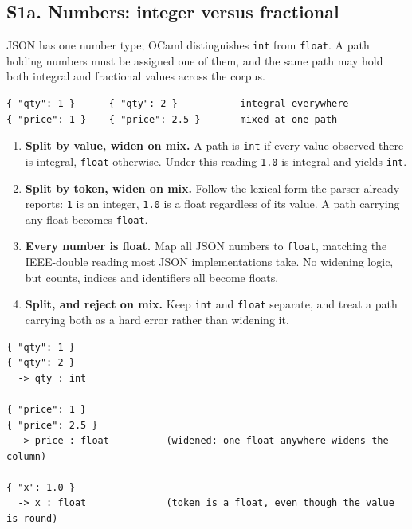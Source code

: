\subsection*{S1a. Numbers: integer versus fractional}

JSON has one number type; OCaml distinguishes \texttt{int} from
\texttt{float}. A path holding numbers must be assigned one of them, and the
same path may hold both integral and fractional values across the corpus.

\begin{lstlisting}[style=json]
{ "qty": 1 }      { "qty": 2 }        -- integral everywhere
{ "price": 1 }    { "price": 2.5 }    -- mixed at one path
\end{lstlisting}

\options
\begin{enumerate}[label=\textbf{(\alph*)}]
  \item \textbf{Split by value, widen on mix.} A path is \texttt{int} if every
        value observed there is integral, \texttt{float} otherwise. Under this
        reading \texttt{1.0} is integral and yields \texttt{int}.
  \item \textbf{Split by token, widen on mix.} Follow the lexical form the
        parser already reports: \texttt{1} is an integer, \texttt{1.0} is a
        float regardless of its value. A path carrying any float becomes
        \texttt{float}. \selected
  \item \textbf{Every number is float.} Map all JSON numbers to \texttt{float},
        matching the IEEE-double reading most JSON implementations take. No
        widening logic, but counts, indices and identifiers all become floats.
  \item \textbf{Split, and reject on mix.} Keep \texttt{int} and \texttt{float}
        separate, and treat a path carrying both as a hard error rather than
        widening it.
\end{enumerate}


\begin{lstlisting}[style=json]
{ "qty": 1 }
{ "qty": 2 }
  -> qty : int

{ "price": 1 }
{ "price": 2.5 }
  -> price : float          (widened: one float anywhere widens the column)

{ "x": 1.0 }
  -> x : float              (token is a float, even though the value is round)
\end{lstlisting}

